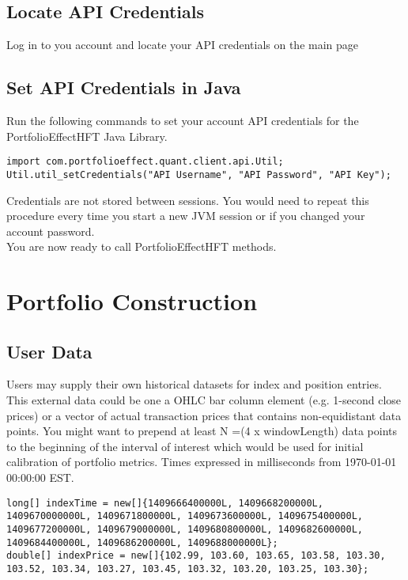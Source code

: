 \documentclass[letterpaper]{report}
\newcounter{N}
\begin{document}
\section{Locate API Credentials} 
Log in to you account and locate your API credentials on the main page

\section{Set API Credentials in Java} 
Run the following commands to set your account API credentials for the PortfolioEffectHFT Java Library.

\begin{lstlisting}
import com.portfolioeffect.quant.client.api.Util;
Util.util_setCredentials("API Username", "API Password", "API Key");
\end{lstlisting}
Credentials are not stored between sessions. You would need to repeat this procedure every time you start a new JVM session or if you changed your account password.\\

You are now ready to call PortfolioEffectHFT methods.




\chapter{Portfolio Construction}
\section{User Data}
Users may supply their own historical datasets for index and position entries. 
This external data could be one a OHLC bar column element (e.g. 1-second close prices) or a vector of actual transaction prices that contains non-equidistant data points. 
You might want to prepend at least N =(4 x windowLength) data points to the
beginning of the interval of interest which would be used for initial calibration of portfolio metrics.
Times expressed in milliseconds from 1970-01-01 00:00:00 EST.

\begin{lstlisting}
long[] indexTime = new[]{1409666400000L, 1409668200000L, 1409670000000L, 1409671800000L, 1409673600000L, 1409675400000L, 1409677200000L, 1409679000000L, 1409680800000L, 1409682600000L, 1409684400000L, 1409686200000L, 1409688000000L};
double[] indexPrice = new[]{102.99, 103.60, 103.65, 103.58, 103.30, 103.52, 103.34, 103.27, 103.45, 103.32, 103.20, 103.25, 103.30};
\end{lstlisting}
\end{document}
